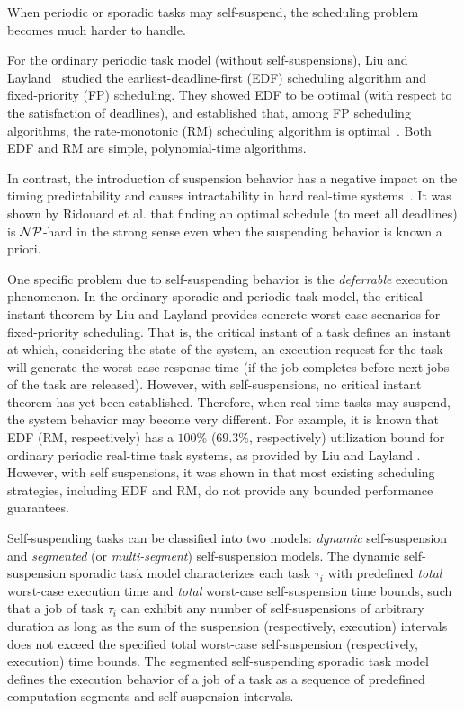 
When  periodic or sporadic tasks may self-suspend, the scheduling problem becomes much harder to handle. 

For the ordinary periodic task model (without self-suspensions), Liu and Layland~ \cite{Liu_1973} studied the earliest-deadline-first (EDF) scheduling algorithm and fixed-priority (FP) scheduling. They showed EDF to be optimal (with respect to the satisfaction of deadlines), and established that, among FP scheduling algorithms, the rate-monotonic (RM) scheduling algorithm is optimal~\cite{Liu_1973}. Both EDF and RM are simple, polynomial-time algorithms. 

In contrast, the introduction of suspension behavior has a negative impact on the timing predictability and causes intractability in hard real-time systems~\cite{Ridouard_2004}. It was shown by Ridouard et al. \cite{Ridouard_2004} that finding an optimal schedule (to meet all deadlines) is ${\cal NP}$-hard in the strong sense even when the suspending behavior is known a priori.


One specific problem due to self-suspending behavior is the \emph{deferrable} execution phenomenon. In the ordinary sporadic and periodic task model, the critical instant theorem by Liu and Layland \cite{Liu_1973} provides concrete worst-case scenarios for fixed-priority scheduling.  That is, the critical instant of a task defines an instant at which, considering the state of the system, an execution request for the task will generate the worst-case response time (if the job completes before next jobs of the task are released).
However, with self-suspensions, no critical instant theorem has yet been established.
Therefore, when real-time tasks may suspend, the system behavior may become very different. For example, it is known that EDF (RM, respectively) has a $100\%$ ($69.3\%$, respectively) utilization bound for ordinary periodic real-time task systems, as provided by Liu and Layland \cite{Liu_1973}. However, with self suspensions,  it was shown in \cite{Ridouard_2004,RTSS-ChenL14} that most existing scheduling strategies, including EDF and RM, do not  provide any bounded performance guarantees. 

Self-suspending tasks can be classified into two models: \emph{dynamic} self-suspension and \emph{segmented} (or \emph{multi-segment}) self-suspension models.
The dynamic self-suspension sporadic task model characterizes each
task $\tau_i$ with predefined \emph{total} worst-case execution time and \emph{total} worst-case self-suspension time bounds, such that a job of task $\tau_i$ can exhibit any number of self-suspensions of arbitrary duration as long as the sum of the suspension (respectively, execution) intervals does not exceed the specified total worst-case self-suspension (respectively, execution) time bounds. The segmented self-suspending sporadic task model defines the execution behavior of a job of a task as a sequence of predefined computation segments and self-suspension intervals.  

